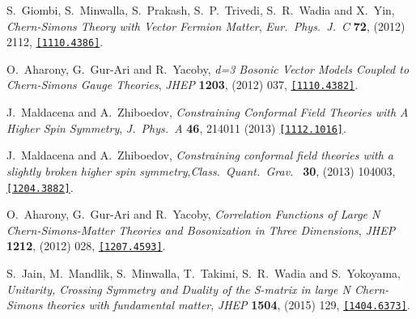   \begin{thebibliography}{99} 
  
  S.~Giombi, S.~Minwalla, S.~Prakash, S.~P.~Trivedi, S.~R.~Wadia and X.~Yin,
  {\it Chern-Simons Theory with Vector Fermion Matter},
  {\it Eur.\ Phys.\ J.\ C} {\bf 72}, (2012) 2112,
  \href{https://arxiv.org/abs/1110.4386}
  {\tt[1110.4386]}.
  
  O.~Aharony, G.~Gur-Ari and R.~Yacoby,
  {\it d=3 Bosonic Vector Models Coupled to Chern-Simons Gauge Theories},
  {\it JHEP} {\bf 1203}, (2012) 037, 
  \href{https://arxiv.org/abs/1110.4382}{\tt[1110.4382]}.
  
  J.~Maldacena and A.~Zhiboedov,
  {\it Constraining Conformal Field Theories with A Higher Spin Symmetry},
 {\it J.\ Phys.\ A} {\bf 46}, 214011 (2013)
   \href{https://arxiv.org/abs/1112.1016}
  {\tt[1112.1016]}.
  
  J.~Maldacena and A.~Zhiboedov,
  {\it Constraining conformal field theories with a slightly broken higher spin symmetry},{\it Class.\ Quant.\ Grav.\ }  {\bf 30}, (2013) 104003,
  \href{https://arxiv.org/abs/1204.3882}
  {\tt[1204.3882]}.

  
  O.~Aharony, G.~Gur-Ari and R.~Yacoby,
 {\it Correlation Functions of Large N Chern-Simons-Matter Theories and Bosonization in Three Dimensions},
 {\it JHEP} {\bf 1212},  (2012) 028,
  \href{https://arxiv.org/abs/1207.4593}
  {\tt[1207.4593]}.

  S.~Jain, M.~Mandlik, S.~Minwalla, T.~Takimi, S.~R.~Wadia and S.~Yokoyama,
 {\it Unitarity, Crossing Symmetry and Duality of the S-matrix in large N Chern-Simons theories with fundamental matter},
 {\it JHEP} {\bf 1504}, (2015) 129,  
  \href{https://arxiv.org/abs/1404.6373}{\tt[1404.6373]}.


\end{thebibliography}
